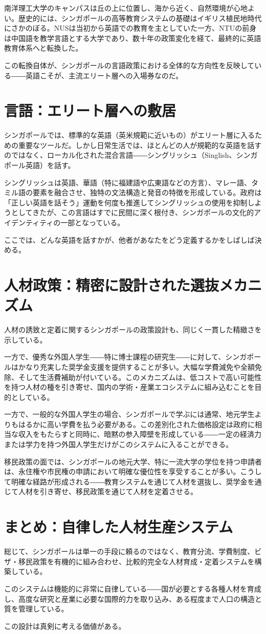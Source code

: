 南洋理工大学のキャンパスは丘の上に位置し、海から近く、自然環境が心地よい。歴史的には、シンガポールの高等教育システムの基礎はイギリス植民地時代にさかのぼる。NUSは当初から英語での教育を主としていた一方、NTUの前身は中国語を教学言語とする大学であり、数十年の政策変化を経て、最終的に英語教育体系へと転換した。

この転換自体が、シンガポールの言語政策における全体的な方向性を反映している――英語こそが、主流エリート層への入場券なのだ。

\section{言語：エリート層への敷居}

シンガポールでは、標準的な英語（英米規範に近いもの）がエリート層に入るための重要なツールだ。しかし日常生活では、ほとんどの人が規範的な英語を話すのではなく、ローカル化された混合言語――シングリッシュ（Singlish、シンガポール英語）を話す。

シングリッシュは英語、華語（特に福建語や広東語などの方言）、マレー語、タミル語の要素を融合させ、独特の文法構造と発音の特徴を形成している。政府は「正しい英語を話そう」運動を何度も推進してシングリッシュの使用を抑制しようとしてきたが、この言語はすでに民間に深く根付き、シンガポールの文化的アイデンティティの一部となっている。

ここでは、どんな英語を話すかが、他者があなたをどう定義するかをしばしば決める。

\section{人材政策：精密に設計された選抜メカニズム}

人材の誘致と定着に関するシンガポールの政策設計も、同じく一貫した精緻さを示している。

一方で、優秀な外国人学生――特に博士課程の研究生――に対して、シンガポールはかなり充実した奨学金支援を提供することが多い。大幅な学費減免や全額免除、そして生活費補助が付いている。このメカニズムは、低コストで高い可能性を持つ人材の種を引き寄せ、国内の学術・産業エコシステムに組み込むことを目的としている。

一方で、一般的な外国人学生の場合、シンガポールで学ぶには通常、地元学生よりもはるかに高い学費を払う必要がある。この差別化された価格設定は政府に相当な収入をもたらすと同時に、暗黙の参入障壁を形成している――一定の経済力または学力を持つ外国人学生だけがこのシステムに入ることができる。

移民政策の面では、シンガポールの地元大学、特に一流大学の学位を持つ申請者は、永住権や市民権の申請において明確な優位性を享受することが多い。こうして明確な経路が形成される――教育システムを通じて人材を選抜し、奨学金を通じて人材を引き寄せ、移民政策を通じて人材を定着させる。

\section{まとめ：自律した人材生産システム}

総じて、シンガポールは単一の手段に頼るのではなく、教育分流、学費制度、ビザ・移民政策を有機的に組み合わせ、比較的完全な人材育成・定着システムを構築している。

このシステムは機能的に非常に自律している――国が必要とする各種人材を育成し、高度な研究と産業に必要な国際的力を取り込み、ある程度まで人口の構造と質を管理している。

この設計は真剣に考える価値がある。
